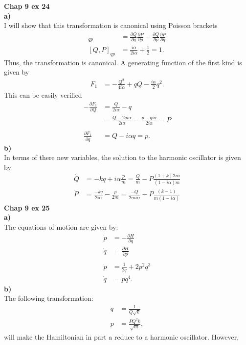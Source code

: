 \documentclass[10pt]{article}
\begin{document}
\textbf{Chap 9 ex 24}\\
\textbf{a)}\\
I will show that this transformation is canonical using Poisson brackets
\begin{align*}
  [Q,P]_{qp} &= \frac{\partial Q}{\partial q}\frac{\partial P}{\partial p}-\frac{\partial Q}{\partial p}\frac{\partial P}{\partial q}\\
  [Q,P]_{qp} &= \frac{i\alpha}{2i\alpha}+\frac{1}{2}=1.
\end{align*}
Thus, the transformation is canonical.  A generating function of the first kind
is given by
\begin{align*}
  F_1 &= -\frac{Q^2}{4i\alpha}+qQ-\frac{i\alpha}{2}q^2.
\end{align*}
This can be easily verified
\begin{align*}
  -\frac{\partial F_1}{\partial Q} &= \frac{Q}{2i\alpha}-q\\
  &=\frac{Q-2qi\alpha}{2i\alpha}=\frac{p-qi\alpha}{2i\alpha}=P\\
  \\
  \frac{\partial F_1}{\partial q} &= Q-i\alpha q=p.
\end{align*}
\textbf{b)}\\
In terms of there new variables, the solution to the harmonic oscillator is given by
\begin{align*}
  \dot{Q} &= -kq+i\alpha\frac{p}{m} = \frac{Q}{m}-P\frac{(1+k)2i\alpha}{(1-i\alpha)m}\\
  \dot{P} &= \frac{-kq}{2i\alpha}-\frac{p}{2m} = \frac{-Q}{2mi\alpha}-P\frac{(k-1)}{m(1-i\alpha)}
\end{align*}
\textbf{Chap 9 ex 25}\\
\textbf{a)}\\
The equations of motion are given by: 
\begin{align*}
  \dot{p} &= -\frac{\partial H}{\partial q}\\
  \dot{q} &= \frac{\partial H}{\partial p}\\
  \\
  \dot{p} &= \frac{1}{2q}+2p^2q^3\\
  \dot{q} &= pq^4.
\end{align*}
\textbf{b)}\\
The following transformation:
\begin{align*}
  q&=\frac{1}{Q\sqrt{k}}\\
  p&=\frac{PQ^2k}{\sqrt{m}},
\end{align*}
will make the Hamiltonian in part a reduce to a harmonic oscillator.  However,
\end{document}
